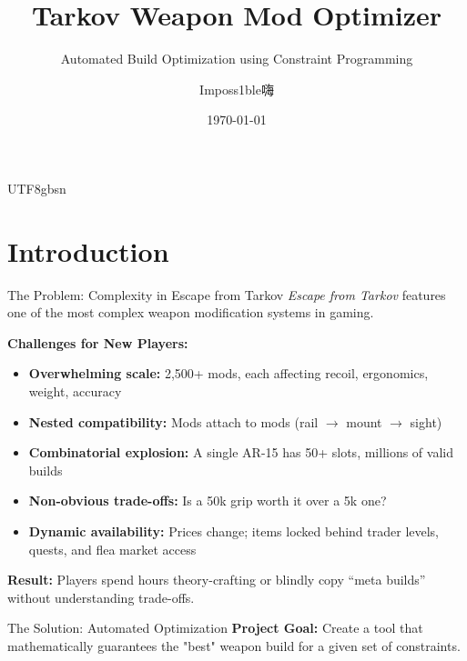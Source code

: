 \documentclass[aspectratio=169]{beamer}
\begin{document}
\begin{CJK*}{UTF8}{gbsn}

\title[Tarkov Weapon Optimizer]{Tarkov Weapon Mod Optimizer}
\subtitle{Automated Build Optimization using Constraint Programming}
\author{Imposs1ble嗨}
\date{\today}

\begin{frame}
    \titlepage
\end{frame}

\section{Introduction}

\begin{frame}{The Problem: Complexity in Escape from Tarkov}
    \textit{Escape from Tarkov} features one of the most complex weapon modification systems in gaming.

    \vspace{0.3cm}
    \textbf{Challenges for New Players:}
    \begin{itemize}
        \item \textbf{Overwhelming scale:} 2,500+ mods, each affecting recoil, ergonomics, weight, accuracy
        \item \textbf{Nested compatibility:} Mods attach to mods (rail $\to$ mount $\to$ sight)
        \item \textbf{Combinatorial explosion:} A single AR-15 has 50+ slots, millions of valid builds
        \item \textbf{Non-obvious trade-offs:} Is a 50k grip worth it over a 5k one?
        \item \textbf{Dynamic availability:} Prices change; items locked behind trader levels, quests, and flea market access
    \end{itemize}

    \vspace{0.3cm}
    \textbf{Result:} Players spend hours theory-crafting or blindly copy ``meta builds'' without understanding trade-offs.
\end{frame}

\begin{frame}{The Solution: Automated Optimization}
    \textbf{Project Goal:}
    Create a tool that mathematically guarantees the "best" weapon build for a given set of constraints.


\end{frame}
\end{CJK*}
\end{document}
